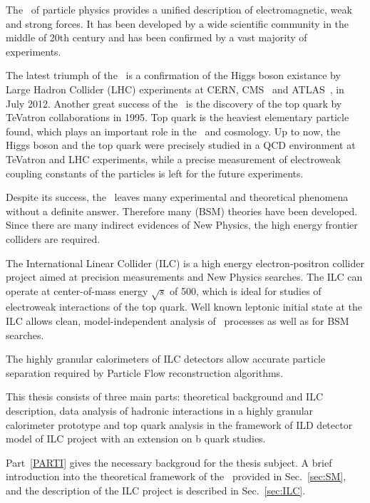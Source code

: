 
The \sm\ of particle physics provides a unified description of electromagnetic, weak and strong forces. It has been developed by a wide scientific community in the middle of 20th century and has been confirmed by a vast majority of experiments. 

The latest triumph of the \sm\ is a confirmation of the Higgs boson existance by Large Hadron Collider (LHC) experiments at CERN, CMS~\cite{bib:HiggsCms} and ATLAS~\cite{bib:HiggsAtlas}, in July 2012.
Another great success of the \sm\ is the discovery of the top quark by TeVatron collaborations in 1995. Top quark is the heaviest elementary particle found, which plays an important role in the \sm\ and cosmology. 
Up to now, the Higgs boson and the top quark were precisely studied in a QCD environment at TeVatron and LHC experiments, while a precise measurement of electroweak coupling constants of the particles is left for the future experiments.

Despite its success, the \sm\ leaves many experimental and theoretical phenomena without a definite answer. Therefore many \bsm (BSM) theories have been developed. 
Since there are many indirect evidences of New Physics, the high energy frontier colliders are required. 

The International Linear Collider \cite{bib:ILC} (ILC) is a high energy electron-positron collider project aimed at precision measurements and New Physics searches. 
The ILC can operate at center-of-mass energy $\sqrt{s}$ of 500\gev, which is ideal for studies of electroweak interactions of the top quark. 
Well known leptonic initial state at the ILC allows clean, model-independent analysis of \sm\ processes as well as for BSM searches. 

The highly granular calorimeters of ILC detectors allow accurate particle separation required by Particle Flow reconstruction algorithms.

This thesis consists of three main parts: theoretical background and ILC description, data analysis of hadronic interactions in a highly granular calorimeter prototype and top quark analysis in the framework of ILD detector model of ILC project with an extension on b quark studies.

Part~\ref{PARTI} gives the necessary backgroud for the thesis subject. A brief introduction into the theoretical framework of the \sm\ provided in Sec.~\ref{sec:SM}, and the description of the ILC project is described in Sec.~\ref{sec:ILC}.

